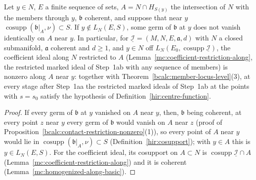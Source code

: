 \begin{proposition}
\label{bcalc:member-restriction-nonzero}
\leanok
Let \(y\in N\), \(E\) a finite sequence of sets, \(A=N\cap H_{S(y)}\) the intersection of \(N\) with the members through \(y\), \(\mathfrak b\) coherent, and suppose that near \(y\)
\(\operatorname{cosupp}(\mathfrak b|_A,\nu)\subset S\). If \(y\notin L_N(E,S)\), some germ of \(\mathfrak b\) at \(y\) does not vanish identically on \(A\) near \(y\). In particular, for
\(\underline{\mathcal I}=(M,N,E,\mathfrak a,d)\) with \(N\) a closed submanifold, \(\mathfrak a\) coherent and \(d\ge1\), and \(y\in N\) off \(L_N(E_0,\operatorname{cosupp}\underline{\mathcal I})\),
the coefficient ideal along \(N\) restricted to \(A\) (Lemma~\ref{mc:coefficient-restriction-along}, the restricted marked ideal of Step~1ab with any sequence of members) is
nonzero along \(A\) near \(y\): together with Theorem~\ref{bcalc:member-locus-level}(3), at every stage after Step~1aa the restricted marked ideals of Step~1ab at the points
with \(s=s_0\) satisfy the hypothesis of Definition~\ref{hir:centre-function}.
\end{proposition}
\begin{proof}
\leanok
If every germ of \(\mathfrak b\) at \(y\) vanished on \(A\) near \(y\), then, \(\mathfrak b\) being coherent, at every point \(z\) near \(y\) every germ of \(\mathfrak b\) would vanish on
\(A\) near \(z\) (proof of Proposition~\ref{bcalc:contact-restriction-nonzero}(1)), so every point of \(A\) near \(y\) would lie in \(\operatorname{cosupp}(\mathfrak b|_A,\nu)\subset S\)
(Definition~\ref{hir:cosupport}); with \(y\in A\) this is \(y\in L_N(E,S)\). For the coefficient ideal, its cosupport on \(A\subset N\) is \(\operatorname{cosupp}\underline{\mathcal I}\cap A\)
(Lemma~\ref{mc:coefficient-restriction-along}) and it is coherent (Lemma~\ref{mc:homogenized-along-basic}).
\end{proof}

